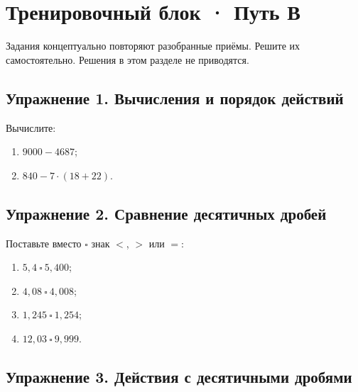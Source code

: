 \documentclass[a4paper,12pt]{article}
\begin{document}

\clearpage

\section*{\color{darkaccent}Тренировочный блок · Путь В}

Задания концептуально повторяют разобранные приёмы.
Решите их самостоятельно. Решения в этом разделе не приводятся.

\vspace{0.7em}

\subsection*{\color{accent}Упражнение 1. Вычисления и порядок действий}

Вычислите:

\begin{enumerate}[label=\arabic*)]
  \item \(9000-4687\);
  \item \(840-7\cdot(18+22)\).
\end{enumerate}

\vspace{0.7em}

\subsection*{\color{accent}Упражнение 2. Сравнение десятичных дробей}

Поставьте вместо \(\square\) знак \(<\), \(>\) или \(=\):

\begin{enumerate}[label=\arabic*)]
  \item \(5{,}4\ \square\ 5{,}400\);
  \item \(4{,}08\ \square\ 4{,}008\);
  \item \(1{,}245\ \square\ 1{,}254\);
  \item \(12{,}03\ \square\ 9{,}999\).
\end{enumerate}

\vspace{0.7em}

\subsection*{\color{accent}Упражнение 3. Действия с десятичными дробями}
\end{document}

